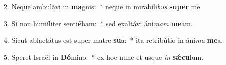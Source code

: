 2. Neque ambulávi in \textbf{ma}gnis:~*  neque in mirabíli\textit{bus} \textbf{su}\textbf{per} me.\

3. Si non humíliter senti\textbf{é}bam:~*  sed exaltávi áni\textit{mam} \textbf{me}am.\

4. Sicut ablactátus est super matre \textbf{su}a:~*  ita retribútio in áni\textit{ma} \textbf{me}a.\

5. Speret Israël in \textbf{Dó}mino:~*  ex hoc nunc et usque \textit{in} \textbf{sǽ}\textbf{cu}lum.\


